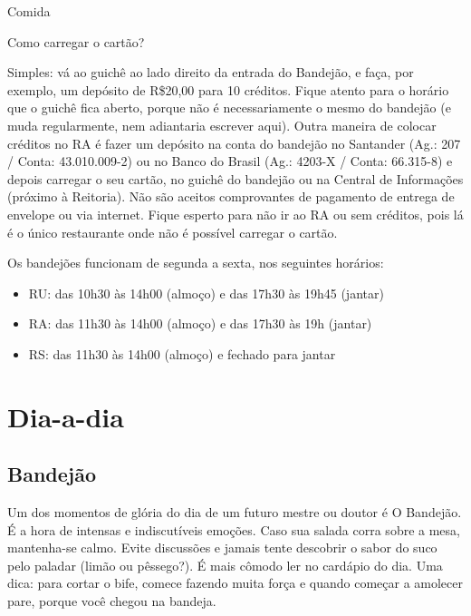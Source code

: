 
\begin{story}{Comida}

\begin{sidebar}{Como carregar o cartão?}

Simples: vá ao guichê ao lado direito da entrada do Bandejão, e faça, por exemplo, um depósito de R\$20,00 para 10 créditos. Fique atento para o horário que o guichê fica aberto, porque não é necessariamente o mesmo do bandejão (e muda regularmente, nem adiantaria escrever aqui). Outra maneira de colocar créditos no RA é fazer um depósito na conta do bandejão no Santander (Ag.: 207 / Conta: 43.010.009-2) ou no Banco do Brasil (Ag.: 4203-X / Conta: 66.315-8) e depois carregar o seu cartão, no guichê do bandejão ou na Central de Informações (próximo à Reitoria). Não são aceitos comprovantes de pagamento de entrega de envelope ou via internet. Fique esperto para não ir ao RA ou sem créditos, pois lá é o único restaurante onde não é possível carregar o cartão.

Os bandejões funcionam de segunda a sexta, nos seguintes horários:

\begin{itemize}
\item RU: das 10h30 às 14h00 (almoço) e das 17h30 às 19h45 (jantar)
\item RA: das 11h30 às 14h00 (almoço) e das 17h30 às 19h (jantar)
\item RS: das 11h30 às 14h00 (almoço) e fechado para jantar
\end{itemize}

\end{sidebar}

\section*{Dia-a-dia}

\subsection*{Bandejão}

Um dos momentos de glória do dia de um futuro mestre ou doutor é O Bandejão. É a hora de intensas e indiscutíveis emoções. Caso sua salada corra sobre a mesa, mantenha-se calmo. Evite discussões e jamais tente descobrir o sabor do suco pelo paladar (limão ou pêssego?). É mais cômodo ler no cardápio do dia. Uma dica: para cortar o bife, comece fazendo muita força e quando começar a amolecer pare, porque você chegou na bandeja.


\end{story}
